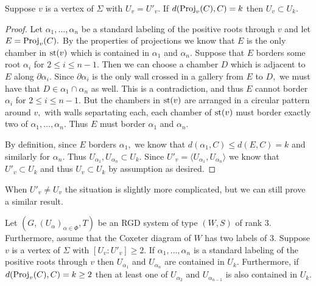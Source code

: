 \documentclass[class=book, crop=false]{standalone}
\begin{document}
\begin{lemma}
	\label{lem:deg3fg}
	Suppose $v$ is a vertex of $\Sigma$ with $U_v=U'_v.$ If $d(\mathrm{Proj}_v(C),C)=k$ then $U_v\subset U_k.$
\end{lemma}
\begin{proof}
	Let $\alpha_1,\dots,\alpha_n$ be a standard labeling of the positive roots through $v$ and let $E=\mathrm{Proj}_v(C).$ By the properties of projections we know that $E$ is the only chamber in $\mathrm{st}(v)$ which is contained in $\alpha_1$ and $\alpha_n.$ Suppose that $E$ borders some root $\alpha_i$ for $2\le i\le n-1.$ Then we can choose a chamber $D$ which is adjacent to $E$ along $\partial\alpha_i.$ Since $\partial \alpha_i$ is the only wall crossed in a gallery from $E$ to $D,$ we must have that $D\in \alpha_1\cap \alpha_n$ as well. This is a contradiction, and thus $E$ cannot border $\alpha_i$ for $2\le i\le n-1.$ But the chambers in $\mathrm{st}(v)$ are arranged in a circular pattern around $v,$ with walls separtating each, each chamber of $\mathrm{st}(v)$ must border exactly two of $\alpha_1,\dots,\alpha_n.$ Thus $E$ must border $\alpha_1$ and $\alpha_n.$

	By definition, since $E$ borders $\alpha_1,$ we know that $d(\alpha_1,C)\le d(E,C)=k$ and similarly for $\alpha_n.$ Thus $U_{\alpha_1},U_{\alpha_n}\subset U_k.$ Since $U'_v=\langle U_{\alpha_1},U_{\alpha_n}\rangle$ we know that $U'_v\subset U_k$ and thus $U_v\subset U_k$ by assumption as desired.
\end{proof}
When $U'_v\neq U_v$ the situation is slightly more complicated, but we can still prove a similar result.
\begin{lemma}
	\label{lem:exdegfg}
	Let $(G,(U_\alpha)_{\alpha\in \Phi},T)$ be an RGD system of type $(W,S)$ of rank $3.$ Furthermore, assume that the Coxeter diagram of $W$ has two labels of $3.$ Suppose $v$ is a vertex of $\Sigma$ with $[U_v:U'_v]\ge 2.$ If $\alpha_1,\dots,\alpha_n$ is a standard labeling of the positive roots through $v$ then $U_{\alpha_1}$ and $U_{\alpha_n}$ are contained in $U_k.$ Furthermore, if $d(\mathrm{Proj}_v(C),C)=k\ge 2$ then at least one of $U_{\alpha_2}$ and $U_{\alpha_{n-1}}$ is also contained in $U_k.$
\end{lemma}
\end{document}
